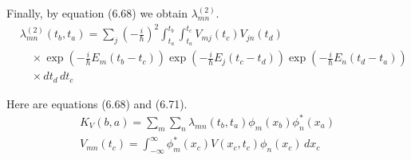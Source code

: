 \documentclass[12pt]{article}
\begin{document}
Finally, by equation (6.68) we obtain $\lambda_{mn}^{(2)}$.
\begin{align*}
&\lambda_{mn}^{(2)}(t_b,t_a)=\sum_j\left(-\frac{i}{\hbar}\right)^2
\int_{t_a}^{t_b}
\int_{t_a}^{t_c}
V_{mj}(t_c)V_{jn}(t_d)
\\
&\quad{}\times
\exp\left(-\frac{i}{\hbar}E_m(t_b-t_c)\right)
\exp\left(-\frac{i}{\hbar}E_j(t_c-t_d)\right)
\exp\left(-\frac{i}{\hbar}E_n(t_d-t_a)\right)
\\
&\quad{}\times dt_d\,dt_c
\end{align*}

Here are equations (6.68) and (6.71).
\begin{gather*}
K_V(b,a)=\sum_m\sum_n\lambda_{mn}(t_b,t_a)\phi_m(x_b)\phi_n^*(x_a)\tag{6.68}
\\
V_{mn}(t_c)=\int_{-\infty}^\infty\phi_m^*(x_c)V(x_c,t_c)\phi_n(x_c)\,dx_c\tag{6.71}
\end{gather*}
\end{document}
